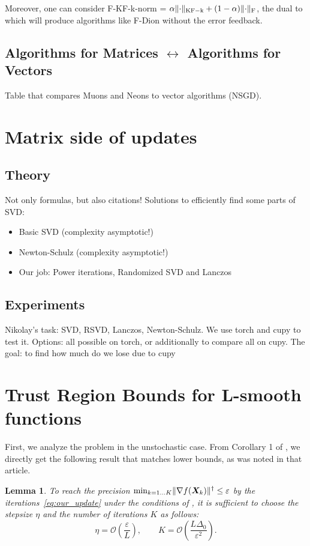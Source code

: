 \documentclass{article} %
\newtheorem{lemma}{Lemma}
\newcommand{\norm}[1]{\lVert #1\rVert}
\renewcommand{\epsilon}{\varepsilon}
\newcommand{\cO}{\mathcal{O}}
\DeclarePairedDelimiter{\normf}{\|}{\|_\mathrm{F}}
\DeclarePairedDelimiter{\normkfk}{\|}{\|_\mathrm{KF-k}}
\begin{document}
        Moreover, one can consider F-KF-k-norm = $\alpha \normkfk{\cdot} + (1-\alpha)\normf{\cdot}$, the dual to which will produce algorithms like F-Dion without the error feedback.


\subsection{Algorithms for Matrices $\leftrightarrow$ Algorithms for Vectors}
Table that compares Muons and Neons to vector algorithms (NSGD).


\section{Matrix side of updates}
    \subsection{Theory}
        Not only formulas, but also citations!
        Solutions to efficiently find some parts of SVD:
        \begin{itemize}
            \item Basic SVD (complexity asymptotic!)
            \item Newton-Schulz (complexity asymptotic!)
            \item Our job: Power iterations, Randomized SVD and Lanczos
        \end{itemize}
    \subsection{Experiments}
        Nikolay's task: SVD, RSVD, Lanczos, Newton-Schulz. We use torch and cupy to test it.
        Options: all possible on torch, or additionally to compare all on cupy. The goal: to find how much do we lose due to cupy

\section{Trust Region Bounds for L-smooth functions}
    First, we analyze the problem in the unstochastic case. From Corollary 1 of \cite{kovalev2025understanding}, we directly get the following result that matches lower bounds, as was noted in that article.


    \begin{lemma}\label{lemma:no_noise_tr}
    To reach the precision $\min_{k=1\ldots K} \norm{\nabla f(\mX_k)}^\dagger \leq \epsilon$ by the iterations~\eqref{eq:our_update} under the conditions of , it is sufficient to choose the stepsize $\eta$ and the number of iterations $K$ as follows:
    \begin{equation}\label{eq:unstoch_tr}
      \eta = \cO\left(\frac{\epsilon}{L}\right),\qquad K = \cO\left(\frac{L\Delta_0}{\epsilon^2}\right).
    \end{equation}
    \end{lemma}
\end{document}
